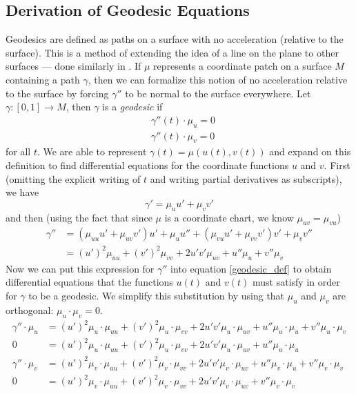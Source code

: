 \documentclass[12pt]{article}
\begin{document}
	\subsection{Derivation of Geodesic Equations}
		Geodesics are defined as paths on a surface with no acceleration (relative to the surface).
		This is a method of extending the idea of a line on the plane to other surfaces --- done similarly in \cite{Lewis_GeodesicsMathematica_2002}.
		If $\mu$ represents a coordinate patch on a surface $M$ containing a path $\gamma$, then we can formalize this notion of no acceleration relative to the surface by forcing $\gamma''$ to be normal to the surface everywhere.
		Let $\gamma:[0,1] \to M$, then $\gamma$ is a \emph{geodesic} if
		\begin{equation} \label{geodesic_def} \begin{split}
			&\gamma''(t) \cdot \mu_u = 0 \\
			&\gamma''(t) \cdot \mu_v = 0
		\end{split} \end{equation}
		for all $t$.
		We are able to represent $\gamma(t) = \mu( u(t) , v(t) )$ and expand on this definition to find differential equations for the coordinate functions $u$ and $v$.
		First (omitting the explicit writing of $t$ and writing partial derivatives as subscripts), we have
		\begin{equation*}
			\gamma' = \mu_u u'+\mu_v v'
		\end{equation*}
		and then (using the fact that since $\mu$ is a coordinate chart, we know $\mu_{uv}=\mu_{vu}$)
		\begin{equation*} \begin{split}
			\gamma'' & = (\mu_{uu} u' + \mu_{uv} v')u' + \mu_u u'' + (\mu_{vu} u' + \mu_{vv} v') v' + \mu_v v'' \\
					 & = (u')^2 \mu_{uu} + (v')^2\mu_{vv} + 2u' v'\mu_{uv} + u''\mu_u + v''\mu_v
		\end{split} \end{equation*}
		Now we can put this expression for $\gamma''$ into equation \ref{geodesic_def} to obtain differential equations that the functions $u(t)$ and $v(t)$ must satisfy in order for $\gamma$ to be a geodesic.
		We simplify this substitution by using that $\mu_u$ and $\mu_v$ are orthogonal: $\mu_u \cdot \mu_v = 0$.
		\begin{equation} \label{geodesic_work} \begin{split}
			\gamma'' \cdot \mu_u & = (u')^2\mu_u \cdot \mu_{uu} + (v')^2\mu_u \cdot \mu_{vv} + 2u' v'\mu_u \cdot \mu_{uv} + u''\mu_u \cdot \mu_u + v''\mu_u \cdot \mu_v \\
			0 & = (u')^2\mu_u \cdot \mu_{uu} + (v')^2\mu_u \cdot \mu_{vv} + 2u' v'\mu_u \cdot \mu_{uv} + u''\mu_u \cdot \mu_u \\
			\gamma'' \cdot \mu_v & = (u')^2\mu_v \cdot \mu_{uu} + (v')^2\mu_v \cdot \mu_{vv} + 2u' v'\mu_v \cdot \mu_{uv} + u''\mu_v \cdot \mu_u + v''\mu_v \cdot \mu_v \\
			0 & = (u')^2\mu_v \cdot \mu_{uu} + (v')^2\mu_v \cdot \mu_{vv} + 2u' v'\mu_v \cdot \mu_{uv} + v''\mu_v \cdot \mu_v \\
		\end{split} \end{equation}
\end{document}
